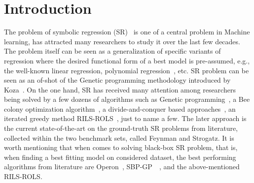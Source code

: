 \documentclass{bmcart}
\begin{document}


	\section{Introduction}\label{sec:introduction}

The problem of symbolic regression (SR)~\cite{billard2002symbolic} is one of a central problem in Machine learning, has attracted many researchers to study it over the last few decades. The problem itself can be seen as a generalization of specific variants of regression where the desired functional form of a best model is pre-assumed, e.g., the well-known linear regression, polynomial regression~\cite{stimson1978interpreting}, etc. SR problem can be seen as an of-shot of the Genetic programming methodology introduced by Koza~\cite{koza1994genetic}.  On the one hand,  SR has received many attention among researchers being solved by a few dozens of algorithms such as Genetic programming~\cite{augusto2000symbolic}, a Bee colony optimization algorithm~\cite{karaboga2012artificial}, a divide-and-conquer based approaches~\cite{udrescu2020ai}, an iterated greedy method RILS-ROLS~\cite{kartelj2023rils}, just to name a few.  The later approach is the current state-of-the-art on the ground-truth SR problems from literature, collected within the two benchmark sets, called Feynman and Strogatz. It is worth mentioning that when comes to solving  black-box SR  problem, that is, when finding a best fitting model on considered dataset, the best performing algorithms from literature are  Operon~\cite{burlacu2020operon}, SBP-GP~~\cite{virgolin2019linear}, and the above-mentioned RILS-ROLS.  
\end{document}
